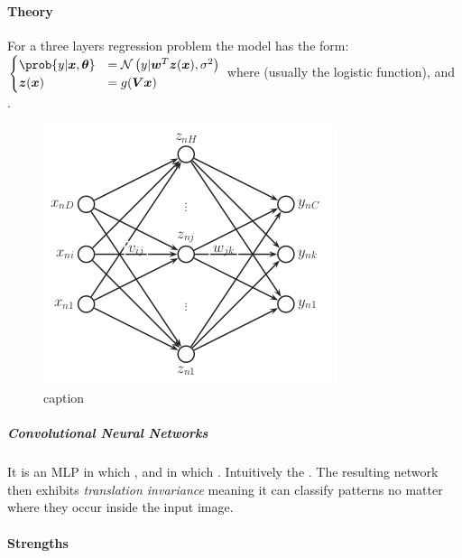\paragraph{Theory}
For a three layers regression problem the model has the form:
$\begin{cases}
    \prob{y|\bm{x},\bm{\theta}} &= \mathcal{N}\left(y|\bm{w}^{T}\bm{z}(\bm{x}), \sigma^{2}\right)\\
    \bm{z}(\bm{x}) &= g(\bm{V}\bm{x})
\end{cases}$
where  (usually the logistic function),  and .
\begin{figure}[H]
    \begin{center}
        \includegraphics[width=.5\textwidth]{./chapters/3_classical_learning/01_supervised_learning/3_images/1_neural_network_one_hl.png}
    \end{center}
    \caption{caption}
    \label{fig:1_neural_network_one_hl}
\end{figure}
\subparagraph{Convolutional Neural Networks}
It is an MLP in which , and in which . 
Intuitively the . The resulting network then exhibits \emph{translation invariance} meaning
it can classify patterns no matter where they occur inside the input image.

\paragraph{Strengths}
